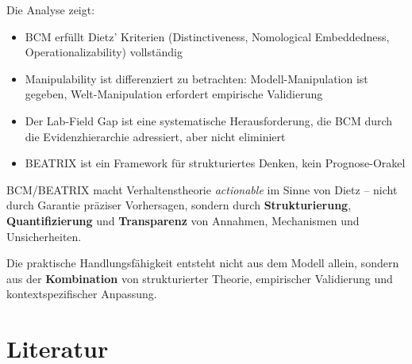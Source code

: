 \documentclass[12pt,a4paper]{article}
\begin{document}
Die Analyse zeigt:
\begin{itemize}
    \item BCM erfüllt Dietz' Kriterien (Distinctiveness, Nomological Embeddedness, Operationalizability) vollständig
    \item Manipulability ist differenziert zu betrachten: Modell-Manipulation ist gegeben, Welt-Manipulation erfordert empirische Validierung
    \item Der Lab-Field Gap ist eine systematische Herausforderung, die BCM durch die Evidenzhierarchie adressiert, aber nicht eliminiert
    \item BEATRIX ist ein Framework für strukturiertes Denken, kein Prognose-Orakel
\end{itemize}

\begin{tcolorbox}[colback=blue!5!white, colframe=darkblue, title=Schlussfolgerung]
BCM/BEATRIX macht Verhaltenstheorie \textit{actionable} im Sinne von Dietz -- nicht durch Garantie präziser Vorhersagen, sondern durch \textbf{Strukturierung}, \textbf{Quantifizierung} und \textbf{Transparenz} von Annahmen, Mechanismen und Unsicherheiten.

Die praktische Handlungsfähigkeit entsteht nicht aus dem Modell allein, sondern aus der \textbf{Kombination} von strukturierter Theorie, empirischer Validierung und kontextspezifischer Anpassung.
\end{tcolorbox}

\section*{Literatur}
\end{document}
